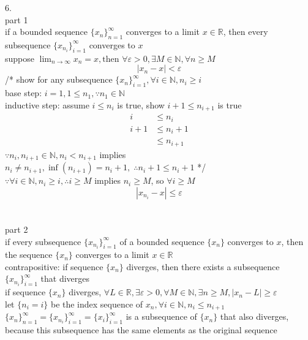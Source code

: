 \documentclass[12pt, border = 4pt, multi]{article} %
\begin{document}
6.\\
part 1\\
if a bounded sequence $\{x_n\}_{n = 1} ^ {\infty}$ converges to a limit $x \in \mathbb{R}$, then every subsequence $\{x_{n_i}\}_{i = 1} ^ {\infty}$ converges to $x$\\
suppose $\lim_{n \rightarrow \infty} x_n = x, \text{then } \forall \varepsilon > 0, \exists M \in \mathbb{N}, \forall n \geq M$
\[|x_n - x| < \varepsilon\]
/* show for any subsequence $\{x_n\}_{i = 1} ^ {\infty}, \forall i \in \mathbb{N}, n_i \geq i$\\
base step: $i = 1, 1 \leq n_1, \because n_1 \in \mathbb{N}$\\
inductive step: assume $i \leq n_i$ is true, show $i + 1 \leq n_{i + 1}$ is true
\begin{align*}
i &\leq n_i\\
i + 1 &\leq n_i + 1\\
&\leq n_{i + 1}
\end{align*}
$\because n_i, n_{i + 1} \in \mathbb{N}, n_i < n_{i + 1}$ implies $n_i \not= n_{i + 1}, \inf(n_{i + 1}) = n_i + 1, \;\therefore n_i + 1 \leq n_i + 1$ */\\
$\because \forall i \in \mathbb{N}, n_i \geq i, \therefore i \geq M$ implies $n_i \geq M$, so $\forall i \geq M$
\[|x_{n_i} - x| \leq \varepsilon\]
\\
\\
part 2\\
if every subsequence $\{x_{n_i}\}_{i = 1} ^ {\infty}$ of a bounded sequence $\{x_n\}$ converges to $x$, then the sequence $\{x_n\}$ converges to a limit $x \in \mathbb{R}$\\
contrapositive: if sequence $\{x_n\}$ diverges, then there exists a subsequence $\{x_{n_i}\}_{i = 1} ^ {\infty}$ that diverges\\
if sequence $\{x_n\}$ diverges, $\forall L \in \mathbb{R}, \exists \varepsilon > 0, \forall M \in \mathbb{N}, \exists n \geq M, |x_n - L| \geq \varepsilon$\\
let $\{n_i = i\}$ be the index sequence of $x_n, \forall i \in \mathbb{N}, n_i \leq n_{i + 1}$\\
$\{x_n\}_{n = 1} ^ {\infty} = \{x_{n_i}\}_{i = 1} ^ {\infty} = \{x_i\}_{i = 1} ^ {\infty}$ is a subsequence of $\{x_n\}$ that also diverges, because this subsequence has the same elements as the original sequence
\end{document}
